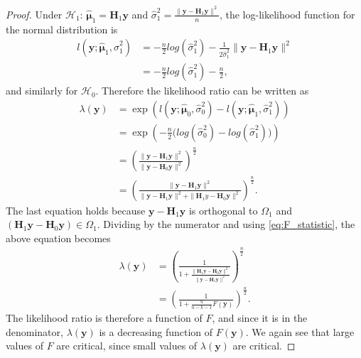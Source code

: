 \begin{proof}
    Under $\mathcal{H}_1$: $\hat{\boldsymbol{\mu}}_1 = \textbf{H}_1 \textbf{y}$ and $\hat{\sigma}_1^2 = \frac{\| \textbf{y} - \textbf{H}_1 \textbf{y} \|^2}{n}$, the log-likelihood 
    function for the normal distribution is
    \begin{align*}
        l(\textbf{y};\hat{\boldsymbol{\mu}}_1, \hat{\sigma}_1^2) &= -\frac{n}{2} log(\hat{\sigma}_1^2) - \frac{1}{2 \hat{\sigma}_1^2} \| \textbf{y} - \textbf{H}_1 \textbf{y} \|^2 \\
        &= -\frac{n}{2} log(\hat{\sigma}_1^2) - \frac{n}{2},
    \end{align*}
    and similarly for $\mathcal{H}_0$. Therefore the likelihood ratio can be written as
    \begin{align*}
        \lambda(\textbf{y}) &= \exp \left( l(\textbf{y};\hat{\boldsymbol{\mu}}_0, \hat{\sigma}_0^2) - l(\textbf{y};\hat{\boldsymbol{\mu}}_1, \hat{\sigma}_1^2) \right) \\
        &= \exp \left( -\frac{n}{2} \Big( log(\hat{\sigma}_0^2) - log(\hat{\sigma}_1^2)\Big) \right) \\
        &= \left( \frac{\| \textbf{y} - \textbf{H}_1 \textbf{y} \|^2}{\| \textbf{y} - \textbf{H}_0 \textbf{y} \|^2} \right)^{\frac{n}{2}} \\
        &= \left( \frac{\| \textbf{y} - \textbf{H}_1 \textbf{y} \|^2}{\| \textbf{y} - \textbf{H}_1 \textbf{y} \|^2 + \| \textbf{H}_1 y - \textbf{H}_0 \textbf{y} \|^2} \right)^{\frac{n}{2}}.
    \end{align*}
    The last equation holds because $\textbf{y} - \textbf{H}_1 \textbf{y}$ is orthogonal to $\Omega_1$ and $(\textbf{H}_1 \textbf{y} - \textbf{H}_0 \textbf{y}) \in \Omega_1$. 
    Dividing by the numerator and using \eqref{eq:F_statistic}, the above equation becomes
    \begin{align*}
        \lambda(\textbf{y}) &= \left( \frac{1}{1 + \frac{\| \textbf{H}_1 \textbf{y} - \textbf{H}_0 \textbf{y} \|^2}{\| \textbf{y} - \textbf{H}_1 \textbf{y} \|^2}} \right)^{\frac{n}{2}} \\
        &= \left( \frac{1}{1 + \frac{q}{n-k-1}F(\textbf{y})}  \right)^{\frac{n}{2}}.
    \end{align*}
    The likelihood ratio is therefore a function of $F$, and since it is in the denominator, $\lambda(\textbf{y})$ is a decreasing function of $F(\textbf{y})$. We again see that large values of $F$ are critical, since small values of $\lambda(\textbf{y})$ are critical.
    

\end{proof}
